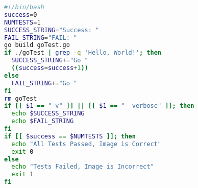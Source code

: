 \begin{lstlisting}[language=bash, caption=Dockerfile Generator Evaluation Script, label=alg:bashScript]
#!/bin/bash
success=0
NUMTESTS=1
SUCCESS_STRING="Success: "
FAIL_STRING="FAIL: "
go build goTest.go
if ./goTest | grep -q 'Hello, World!'; then
  SUCCESS_STRING+="Go "
  ((success=success+1))
else
  FAIL_STRING+="Go "
fi
rm goTest
if [[ $1 == "-v" ]] || [[ $1 == "--verbose" ]]; then
  echo $SUCCESS_STRING
  echo $FAIL_STRING
fi
if [[ $success == $NUMTESTS ]]; then
  echo "All Tests Passed, Image is Correct"
  exit 0
else
  echo "Tests Failed, Image is Incorrect"
  exit 1
fi
\end{lstlisting}
